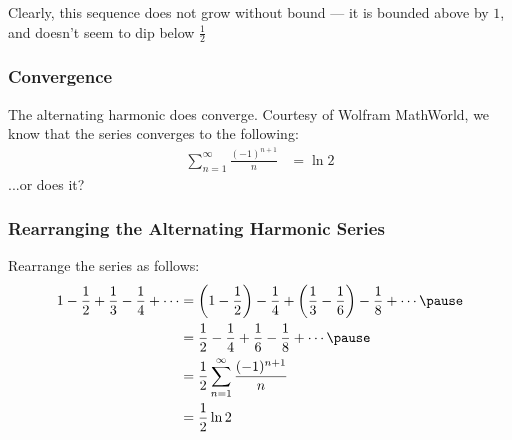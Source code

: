 \documentclass{beamer}
\begin{document}
\begin{frame}
  Clearly, this sequence does not grow without bound --- it is bounded above by $1$, and doesn't seem to dip below $\frac{1}{2}$
\end{frame}
\begin{frame}
  \frametitle{Convergence}
  The alternating harmonic does converge. Courtesy of Wolfram MathWorld, we know that the series converges to the following:
  \begin{align*}
    \sum_{n=1}^{\infty}\frac{(-1)^{n+1}}{n} &= \ln 2
  \end{align*}\pause
  ...or does it? 
\end{frame}
\begin{frame}
  \frametitle{Rearranging the Alternating Harmonic Series}
  Rearrange the series as follows:
  \begin{align*}
    1 - \frac{1}{2} + \frac{1}{3} - \frac{1}{4} + \cdots &= \left(1-\frac{1}{2}\right) - \frac{1}{4} + \left(\frac{1}{3} - \frac{1}{6}\right) - \frac{1}{8} + \cdots\pause\\
                                                                       &= \frac{1}{2} - \frac{1}{4} + \frac{1}{6} - \frac{1}{8} + \cdots\pause\\
                                                                       &= \frac{1}{2}\sum_{n=1}^{\infty}\frac{(-1)^{n+1}}{n}\\
                                                                       &= \frac{1}{2}\ln 2
  \end{align*}
\end{frame}
\end{document}
